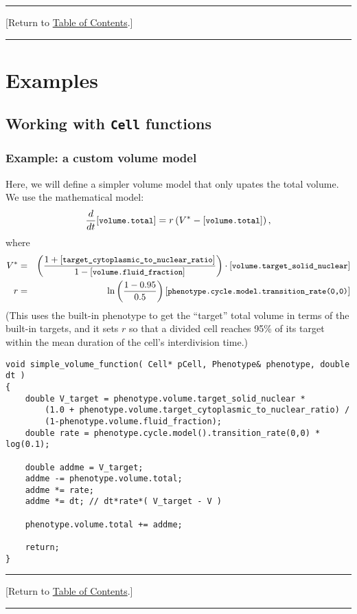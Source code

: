 \documentclass[12pt]{article}
\newcommand{\beq}{\begin{equation}}
\newcommand{\eeq}{\end{equation}}
\newcommand{\beqa}{\begin{eqnarray}}
\newcommand{\eeqa}{\end{eqnarray}}
\renewcommand{\tt}[1]{{\small \left[\texttt{#1}\right] }}
\newcommand{\TOClink}{\begin{center}\hrule\vskip-10pt\phantom{.}\hfill[Return to \hyperlink{TOC}{Table of Contents}.]\hfill\phantom{.}\vskip3pt\hrule\end{center}}
\begin{document}
\TOClink 

\section{Examples}
\label{sec:Examples}

\subsection{Working with \texttt{Cell} functions}

\subsubsection{Example: a custom volume model}
\label{sec:Examples:volume_model}
Here, we will define a simpler volume model that only 
upates the total volume. We 
use the mathematical model: 
\beq
\frac{d}{dt} 
\tt{volume.total} = r \left( V^* - \tt{volume.total} \right),  
\eeq
where 
\beqa
V^* & = & \left( \frac{1 + \tt{target\_cytoplasmic\_to\_nuclear\_ratio}}
{1 - \tt{volume.fluid\_fraction}} \right) \cdot 
\tt{volume.target\_solid\_nuclear} \\
r & = & 
\ln\left( 
\frac{1 - 0.95}{0.5}
\right) \tt{phenotype.cycle.model.transition\_rate(0,0)} 
\eeqa
(This uses the built-in phenotype to get the ``target'' total volume in 
terms of the built-in  targets, and it sets $r$ so that a divided cell reaches 
95\% of its target within the mean duration of the cell's interdivision 
time.) 
\begin{verbatim}
void simple_volume_function( Cell* pCell, Phenotype& phenotype, double dt )
{
    double V_target = phenotype.volume.target_solid_nuclear * 
        (1.0 + phenotype.volume.target_cytoplasmic_to_nuclear_ratio) / 
        (1-phenotype.volume.fluid_fraction); 
    double rate = phenotype.cycle.model().transition_rate(0,0) * log(0.1); 
    
    double addme = V_target; 
    addme -= phenotype.volume.total; 
    addme *= rate; 
    addme *= dt; // dt*rate*( V_target - V )
    
    phenotype.volume.total += addme; 
    
    return; 
}
\end{verbatim}

\TOClink 
\end{document}
